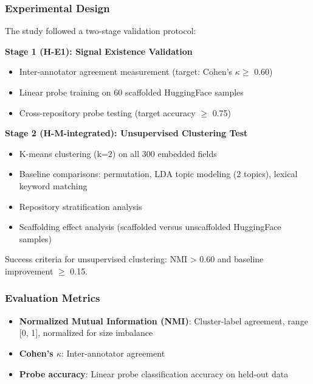 \subsubsection{Experimental Design}

The study followed a two-stage validation protocol:

\textbf{Stage 1 (H-E1): Signal Existence Validation}
\begin{itemize}
\item Inter-annotator agreement measurement (target: Cohen's $\kappa \geq$ 0.60)
\item Linear probe training on 60 scaffolded HuggingFace samples
\item Cross-repository probe testing (target accuracy $\geq$ 0.75)
\end{itemize}

\textbf{Stage 2 (H-M-integrated): Unsupervised Clustering Test}
\begin{itemize}
\item K-means clustering (k=2) on all 300 embedded fields
\item Baseline comparisons: permutation, LDA topic modeling (2 topics), lexical keyword matching
\item Repository stratification analysis
\item Scaffolding effect analysis (scaffolded versus unscaffolded HuggingFace samples)
\end{itemize}

Success criteria for unsupervised clustering: NMI > 0.60 and baseline improvement $\geq$ 0.15.

\subsubsection{Evaluation Metrics}

\begin{itemize}
\item \textbf{Normalized Mutual Information (NMI)}: Cluster-label agreement, range [0, 1], normalized for size imbalance
\item \textbf{Cohen's $\kappa$}: Inter-annotator agreement
\item \textbf{Probe accuracy}: Linear probe classification accuracy on held-out data
\end{itemize}

